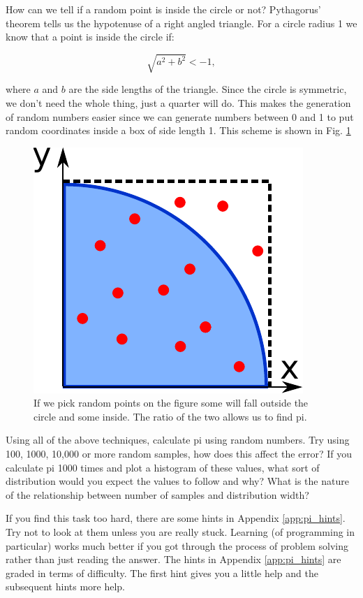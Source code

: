 	How can we tell if a random point is inside the circle or not? Pythagorus' theorem tells us the hypotenuse of a right angled triangle. For a circle radius 1 we know that a point is inside the circle if:

	\begin{equation}
	\sqrt{a^2+b^2} <- 1,
	\end{equation}

	where $a$ and $b$ are the side lengths of the triangle. Since the circle is symmetric, we don't need the whole thing, just a quarter will do. This makes the generation of random numbers easier since we can generate numbers between 0 and 1 to put random coordinates inside a box of side length 1. This scheme is shown in Fig. \ref{fig:piarc}

	\begin{figure}[h]
		\centering
		\includegraphics[scale=0.6]{images/piarc}
		\caption{If we pick random points on the figure some will fall outside the circle and some inside. The ratio of the two allows us to find pi.}
		\label{fig:piarc}
	\end{figure}

	\begin{task}Using all of the above techniques, calculate pi using random numbers. Try using 100, 1000, 10,000 or more random samples, how does this affect the error? If you calculate pi 1000 times and plot a histogram of these values, what sort of distribution would you expect the values to follow and why? What is the nature of the relationship between number of samples and distribution width?\end{task}
	If you find this task too hard, there are some hints in Appendix \ref{app:pi_hints}. Try not to look at them unless you are really stuck. Learning (of programming in particular) works much better if you got through the process of problem solving rather than just reading the answer. The hints in Appendix \ref{app:pi_hints} are graded in terms of difficulty. The first hint gives you a little help and the subsequent hints more help.

